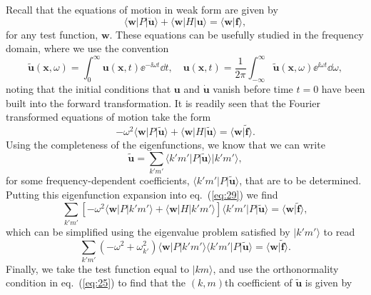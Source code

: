 Recall that the equations of motion in weak form are given by
\begin{equation}
\langle \mathbf{w}|P|\ddot{\mathbf{u}}\rangle+\langle \mathbf{w}|H|\mathbf{u}\rangle=\langle \mathbf{w}|\mathbf{f}\rangle,
\label{eq:27}
\end{equation}
for any test function, $\mathbf{w}$. These equations can be usefully studied in the frequency domain, 
where we use the convention
\begin{equation}
\tilde{\mathbf{u}}(\mathbf{x},\omega)=\int_{0}^{\infty}\mathbf{u}(\mathbf{x},t)\ee^{-\ii\omega t}\dd t,
 \quad \mathbf{u}(\mathbf{x},t)=\frac{1}{2\pi}\int_{-\infty}^{\infty}\tilde{\mathbf{u}}(\mathbf{x},\omega)\ee^{\ii\omega t}\dd\omega,
\label{eq:28}
\end{equation}
noting that the initial conditions that $\mathbf{u}$ and $\dot{\mathbf{u}}$ vanish before time $t=0$ have been built into the forward transformation. It is 
readily seen that the Fourier transformed equations of motion take the form
\begin{equation}
-\omega^{2}\langle \mathbf{w}|P|\tilde{\mathbf{u}}\rangle+\langle \mathbf{w}|H|\tilde{\mathbf{u}}\rangle=\langle \mathbf{w}|\tilde{\mathbf{f}}\rangle.
\label{eq:29}
\end{equation}
Using the completeness of the eigenfunctions, we know that we can write
\begin{equation}
\tilde{\mathbf{u}}=\sum_{k'm'}\langle k'm'|P|\tilde{\mathbf{u}}\rangle|k'm'\rangle,
\label{eq:30}
\end{equation}
for some frequency-dependent coefficients, $\langle k'm'|P|\tilde{\mathbf{u}}\rangle$, that are to be determined. Putting this eigenfunction expansion into eq.~(\ref{eq:29}) we find
\begin{equation}
\sum_{k'm'}[-\omega^{2}\langle \mathbf{w}|P|k'm'\rangle+\langle \mathbf{w}|H|k'm'\rangle]\langle k'm'|P|\tilde{\mathbf{u}}\rangle=\langle \mathbf{w}|\tilde{\mathbf{f}}\rangle,
\label{eq:31}
\end{equation}
which can be simplified using the eigenvalue problem satisfied by $|k'm'\rangle$ to read
\begin{equation}
\sum_{k'm'}(-\omega^{2}+\omega_{k'}^{2})\langle \mathbf{w}|P|k'm'\rangle\langle k'm'|P|\tilde{\mathbf{u}}\rangle=\langle \mathbf{w}|\tilde{\mathbf{f}}\rangle.
\label{eq:32}
\end{equation}
Finally, we take the test function equal to $|km\rangle$, and use the orthonormality condition in eq.~(\ref{eq:25}) to find that the $(k,m)$th coefficient of $\tilde{\mathbf{u}}$ is given by
